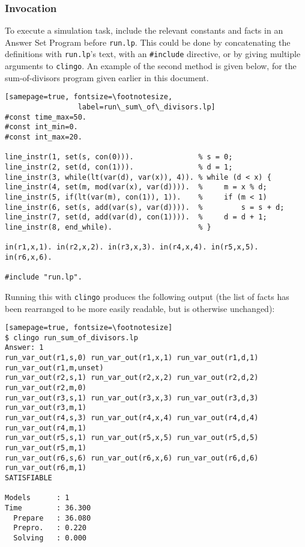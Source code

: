 \documentclass[a4paper,twoside,notitlepage,12pt]{article}
\begin{document}
\subsubsection{Invocation} \label{sec:sim:inv}

To execute a simulation task, include the relevant constants and facts in an Answer Set 
Program before \verb|run.lp|. This could be done by concatenating the definitions with 
\verb|run.lp|'s text, with an \verb|#include| directive, or by giving multiple 
arguments to \verb|clingo|. An example of the second method is given below, for the 
sum-of-divisors program given earlier in this document.

\clearpage
\begin{verbatim}[samepage=true, fontsize=\footnotesize,
                 label=run\_sum\_of\_divisors.lp]
#const time_max=50.
#const int_min=0.
#const int_max=20.

line_instr(1, set(s, con(0))).               % s = 0;
line_instr(2, set(d, con(1))).               % d = 1;
line_instr(3, while(lt(var(d), var(x)), 4)). % while (d < x) {
line_instr(4, set(m, mod(var(x), var(d)))).  %     m = x % d;
line_instr(5, if(lt(var(m), con(1)), 1)).    %     if (m < 1)
line_instr(6, set(s, add(var(s), var(d)))).  %         s = s + d;
line_instr(7, set(d, add(var(d), con(1)))).  %     d = d + 1;
line_instr(8, end_while).                    % }

in(r1,x,1). in(r2,x,2). in(r3,x,3). in(r4,x,4). in(r5,x,5). in(r6,x,6).

#include "run.lp".
\end{verbatim}

Running this with \verb|clingo| produces the following output (the list of facts has 
been rearranged to be more easily readable, but is otherwise unchanged):

\begin{verbatim}[samepage=true, fontsize=\footnotesize]
$ clingo run_sum_of_divisors.lp
Answer: 1
run_var_out(r1,s,0) run_var_out(r1,x,1) run_var_out(r1,d,1) run_var_out(r1,m,unset)
run_var_out(r2,s,1) run_var_out(r2,x,2) run_var_out(r2,d,2) run_var_out(r2,m,0)
run_var_out(r3,s,1) run_var_out(r3,x,3) run_var_out(r3,d,3) run_var_out(r3,m,1)
run_var_out(r4,s,3) run_var_out(r4,x,4) run_var_out(r4,d,4) run_var_out(r4,m,1)
run_var_out(r5,s,1) run_var_out(r5,x,5) run_var_out(r5,d,5) run_var_out(r5,m,1)
run_var_out(r6,s,6) run_var_out(r6,x,6) run_var_out(r6,d,6) run_var_out(r6,m,1)
SATISFIABLE

Models      : 1     
Time        : 36.300
  Prepare   : 36.080
  Prepro.   : 0.220
  Solving   : 0.000
\end{verbatim}
\end{document}
